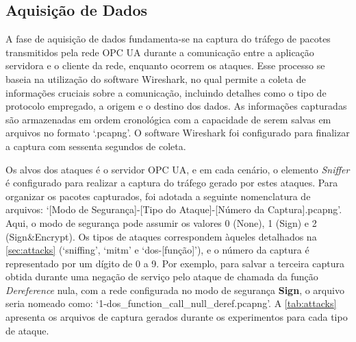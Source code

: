     \subsection{Aquisição de Dados}

    A fase de aquisição de dados fundamenta-se na captura do tráfego de pacotes transmitidos pela rede OPC UA durante a comunicação entre a aplicação servidora e o cliente da rede, enquanto ocorrem os ataques. Esse processo se baseia na utilização do software Wireshark, no qual permite a coleta de informações cruciais sobre a comunicação, incluindo detalhes como o tipo de protocolo empregado, a origem e o destino dos dados. As informações capturadas são armazenadas em ordem cronológica com a capacidade de serem salvas em arquivos no formato `.pcapng'. O software Wireshark foi configurado para finalizar a captura com sessenta segundos de coleta.

    Os alvos dos ataques é o servidor OPC UA, e em cada cenário, o elemento \textit{Sniffer} é configurado para realizar a captura do tráfego gerado por estes ataques. Para organizar os pacotes capturados, foi adotada a seguinte nomenclatura de arquivos: `[Modo de Segurança]-[Tipo do Ataque]-[Número da Captura].pcapng'. Aqui, o modo de segurança pode assumir os valores 0 (None), 1 (Sign) e 2 (Sign\&Encrypt). Os tipos de ataques correspondem àqueles detalhados na \autoref{sec:attacks} (`sniffing', `mitm' e `dos-[função]'), e o número da captura é representado por um dígito de 0 a 9. Por exemplo, para salvar a terceira captura obtida durante uma negação de serviço pelo ataque de chamada da função \textit{Dereference} nula, com a rede configurada no modo de segurança \textbf{Sign}, o arquivo seria nomeado como: `1-dos\_function\_call\_null\_deref.pcapng'. A \autoref{tab:attacks} apresenta os arquivos de captura gerados durante os experimentos para cada tipo de ataque.

